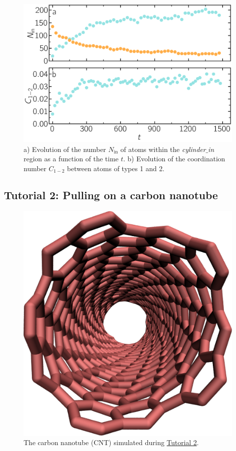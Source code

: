 \documentclass[9pt,tutorial]{livecoms}
\begin{document}
\begin{figure}
\centering
\includegraphics[width=\linewidth]{LJ-mixing}
\caption{a) Evolution of the number $N_\text{in}$ of atoms within the \textit{cylinder$\_$in} region as a function of the time $t$. b) Evolution of the coordination number $C_{1-2}$ between atoms of types 1 and 2.}
\label{fig:mixing}
\end{figure}

\subsection{Tutorial 2: Pulling on a carbon nanotube}
\label{carbon-nanotube-label}

\begin{figure}
\centering
\includegraphics[width=0.55\linewidth]{CNT}
\caption{The carbon nanotube (CNT) simulated during \hyperref[carbon-nanotube-label]{Tutorial 2}.}
\label{fig:CNT}
\end{figure}
\end{document}
